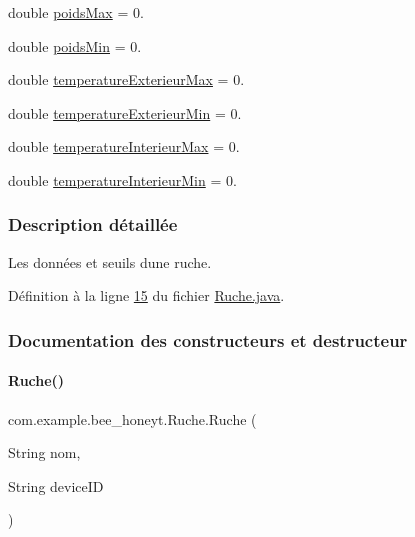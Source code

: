 \begin{DoxyCompactItemize}
double \hyperlink{classcom_1_1example_1_1bee__honeyt_1_1_ruche_a5901bf432f6d2de0e5facb8952277cbc}{poids\+Max} = 0.
\item 
double \hyperlink{classcom_1_1example_1_1bee__honeyt_1_1_ruche_a3408f099f2fab8700353e6e266fe8221}{poids\+Min} = 0.
\item 
double \hyperlink{classcom_1_1example_1_1bee__honeyt_1_1_ruche_afd45ecd796457b633615488195153114}{temperature\+Exterieur\+Max} = 0.
\item 
double \hyperlink{classcom_1_1example_1_1bee__honeyt_1_1_ruche_a6e88eae7cc58b7c7ca3846d789fe1c2b}{temperature\+Exterieur\+Min} = 0.
\item 
double \hyperlink{classcom_1_1example_1_1bee__honeyt_1_1_ruche_af2d8d214dabc9af08329aa3173047245}{temperature\+Interieur\+Max} = 0.
\item 
double \hyperlink{classcom_1_1example_1_1bee__honeyt_1_1_ruche_a143b0b293ab3aaa67a86550efeb56f07}{temperature\+Interieur\+Min} = 0.
\end{DoxyCompactItemize}


\subsubsection{Description détaillée}
Les données et seuils d\textquotesingle{}une ruche. 

Définition à la ligne \hyperlink{_ruche_8java_source_l00015}{15} du fichier \hyperlink{_ruche_8java_source}{Ruche.\+java}.



\subsubsection{Documentation des constructeurs et destructeur}
\mbox{\label{classcom_1_1example_1_1bee__honeyt_1_1_ruche_aab68c5c3479f1def1b57a4d8b9cca9cd}} 
\paragraph{\texorpdfstring{Ruche()}{Ruche()}\hspace{0.1cm}{\footnotesize\ttfamily [1/3]}}
{\footnotesize\ttfamily com.\+example.\+bee\+\_\+honeyt.\+Ruche.\+Ruche (\begin{DoxyParamCaption}\item[{String}]{nom,  }\item[{String}]{device\+ID }\end{DoxyParamCaption})}



